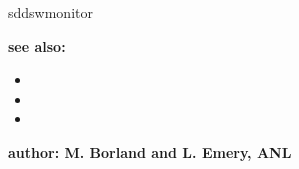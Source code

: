 \begin{sddsprog}{sddswmonitor}
\item {\bf see also:}
    \begin{itemize}
%
%
    \item {}
    \item {}
    \item {}
    \end{itemize}
%
%
\item {\bf author: M. Borland and L. Emery, ANL} 
\end{sddsprog}

